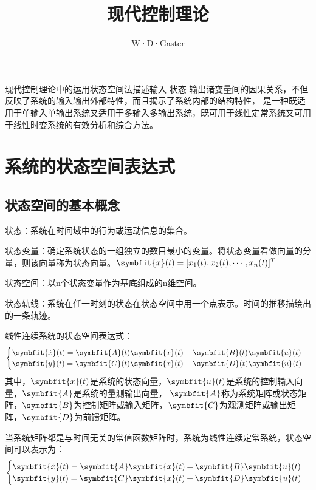 \documentclass[11pt,a4paper]{ctexart}
\title{现代控制理论}
\author{W·D·Gaster}
\newcommand{\bm}{\symbfit}
\begin{document}
\maketitle
\thispagestyle{empty}
\newpage

\tableofcontents
\thispagestyle{empty}
\newpage

\setcounter{page}{1}
    
现代控制理论中的运用状态空间法描述输入-状态-输出诸变量间的因果关系，不但反映了系统的输入输出外部特性，而且揭示了系统内部的结构特性，
是一种既适用于单输入单输出系统又适用于多输入多输出系统，既可用于线性定常系统又可用于线性时变系统的有效分析和综合方法。

\section{系统的状态空间表达式}
    \subsection{状态空间的基本概念}
        状态：系统在时间域中的行为或运动信息的集合。

        状态变量：确定系统状态的一组独立的数目最小的变量。将状态变量看做向量的分量，则该向量称为状态向量。$\bm{x}(t)=[x_1(t),x_2(t),\cdots,x_n(t)]^T$

        状态空间：以n个状态变量作为基底组成的n维空间。

        状态轨线：系统在任一时刻的状态在状态空间中用一个点表示。时间的推移描绘出的一条轨迹。

        线性连续系统的状态空间表达式：
        \[
        \begin{cases}
            \bm{\dot{x}}(t)=\bm{A}(t)\bm{x}(t)+\bm{B}(t)\bm{u}(t)\\
            \bm{y}(t)=\bm{C}(t)\bm{x}(t)+\bm{D}(t)\bm{u}(t)\\
        \end{cases}
        \]
        其中，$\bm{x}(t)$是系统的状态向量，$\bm{u}(t)$是系统的控制输入向量，$\bm{A}$是系统的量测输出向量，
        $\bm{A}$称为系统矩阵或状态矩阵，$\bm{B}$为控制矩阵或输入矩阵，$\bm{C}$为观测矩阵或输出矩阵，$\bm{D}$为前馈矩阵。

        当系统矩阵都是与时间无关的常值函数矩阵时，系统为线性连续定常系统，状态空间可以表示为：
        \[
        \begin{cases}
            \bm{\dot{x}}(t)=\bm{A}\bm{x}(t)+\bm{B}\bm{u}(t)\\
            \bm{y}(t)=\bm{C}\bm{x}(t)+\bm{D}\bm{u}(t)\\
        \end{cases}
        \]
\end{document}
